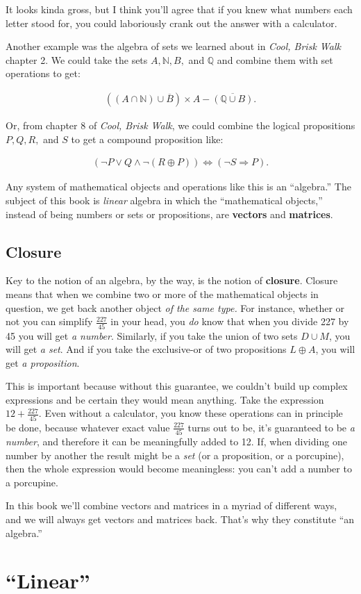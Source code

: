It looks kinda gross, but I think you'll agree that if you knew what numbers
each letter stood for, you could laboriously crank out the answer with a
calculator.

Another example was the algebra of sets we learned about in \textit{Cool, Brisk
Walk} chapter 2. We could take the sets $A, \mathbb{N}, B,$ and $\mathbb{Q}$
and combine them with set operations to get:

\vspace{-.25in}
\begin{align*}
((A \cap \mathbb{N}) \cup \overline{B}) \times A - \overline{(\mathbb{Q} \cup
B)}.
\end{align*}

Or, from chapter 8 of \textit{Cool, Brisk Walk}, we could combine the logical
propositions $P, Q, R,$ and $S$ to get a compound proposition like:

\vspace{-.25in}
\begin{align*}
(\neg P \vee Q \wedge \neg (R \oplus P)) \Leftrightarrow (\neg S \Rightarrow P).
\end{align*}

Any system of mathematical objects and operations like this is an ``algebra.''
The subject of this book is \textit{linear} algebra in which the ``mathematical
objects,'' instead of being numbers or sets or propositions, are
\textbf{vectors} and \textbf{matrices}.

\subsection{Closure}

Key to the notion of an algebra, by the way, is the notion of \textbf{closure}.
Closure means that when we combine two or more of the mathematical objects in
question, we get back another object \textit{of the same type.} For instance,
whether or not you can simplify $\frac{227}{45}$ in your head, you \textit{do}
know that when you divide 227 by 45 you will get \textit{a number}. Similarly,
if you take the union of two sets $D \cup M$, you will get \textit{a set}. And
if you take the exclusive-or of two propositions $L \oplus A$, you will get
\textit{a proposition}.


This is important because without this guarantee, we couldn't build up complex
expressions and be certain they would mean anything. Take the expression
$12 + \frac{227}{45}$. Even without a calculator, you know these operations can
in principle be done, because whatever exact value $\frac{227}{45}$ turns out
to be, it's guaranteed to be \textit{a number}, and therefore it can be
meaningfully added to 12. If, when dividing one number by another the result
might be a \textit{set} (or a proposition, or a porcupine), then the whole
expression would become meaningless: you can't add a number to a porcupine.

In this book we'll combine vectors and matrices in a myriad of different ways,
and we will always get vectors and matrices back. That's why they constitute
``an algebra.''

\section{``Linear''}
